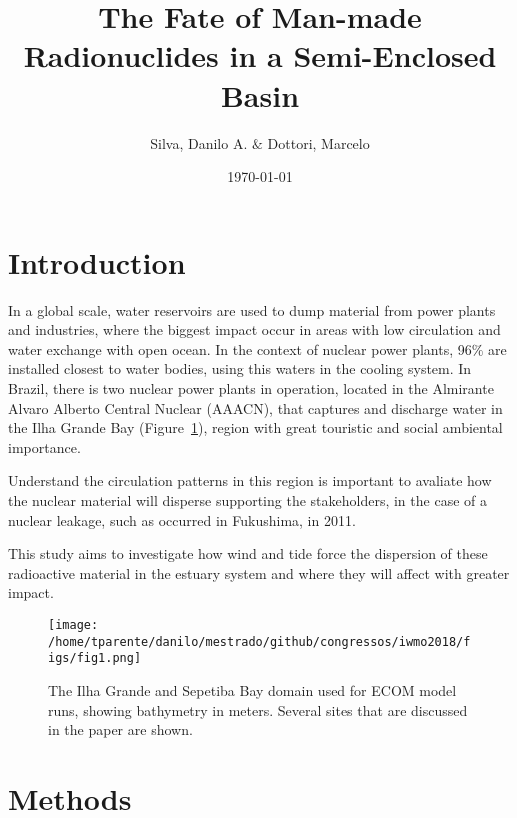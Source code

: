 \documentclass[final]{beamer}
\title
[24$^{o}$ Simpósio Internacional de Iniciação Científica da USP] %
{ %
The Fate of Man-made Radionuclides in a Semi-Enclosed Basin
}
\author{ Silva, Danilo A.\inst{1} $\&$ Dottori, Marcelo\inst{2}
}
\institute[Instituto Oceanográfico - Universidade de São Paulo]
{
Instituto Oceanográfico da Universidade de São Paulo (IOUSP)\\ [0.2ex]
\inst{1} danilo2.silva@usp.br; \inst{2} mdottori@usp.br
}
\date{\today}
\begin{document}
\begin{frame}
\begin{multicols}{2}

\section{Introduction}

In a global scale, water reservoirs are used to dump material from power plants and
industries, where the biggest impact occur in areas with low circulation and water
exchange with open ocean. In the context of nuclear power plants, 96$\%$ are installed
closest to water bodies, using this waters in the cooling system. In Brazil, there is
two nuclear power plants in operation, located in the Almirante Alvaro Alberto 
Central Nuclear (AAACN), that captures and discharge water in the Ilha Grande Bay
(Figure~\ref{fig:areaestudo}), region with great touristic and social ambiental importance.

Understand the circulation patterns in this region is important to avaliate how the nuclear
material will disperse supporting the stakeholders, in the case of a nuclear leakage, such
as occurred in Fukushima, in 2011.

This study aims to investigate how wind and tide force the dispersion of these radioactive material in the
estuary system and where they will affect with greater impact.

\vspace{.1in}
\begin{figure}
\centering
\texttt{[image: /home/tparente/danilo/mestrado/github/congressos/iwmo2018/figs/fig1.png]}
\vspace{.1in}
\caption{The Ilha Grande and Sepetiba Bay domain used for ECOM model runs, showing bathymetry in meters. Several sites that are discussed in the paper are shown.}
\label{fig:areaestudo}
\end{figure}
\vspace{-.5in}
\section{Methods}


\end{multicols}
\end{frame}
\end{document}
